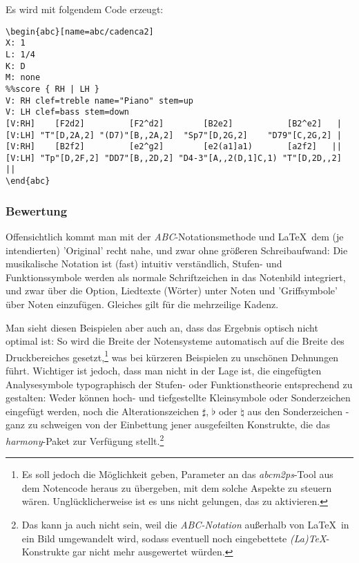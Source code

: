 Es wird mit folgendem Code erzeugt:
\begin{verbatim}
\begin{abc}[name=abc/cadenca2]
X: 1
L: 1/4 
K: D 
M: none
%%score { RH | LH }
V: RH clef=treble name="Piano" stem=up
V: LH clef=bass stem=down
[V:RH]    [F2d2]         [F2^d2]        [B2e2]           [B2^e2]   |
[V:LH] "T"[D,2A,2] "(D7)"[B,,2A,2]  "Sp7"[D,2G,2]    "D79"[C,2G,2] |
[V:RH]    [B2f2]         [e2^g2]        [e2(a1]a1)       [a2f2]   ||
[V:LH] "Tp"[D,2F,2] "DD7"[B,,2D,2] "D4-3"[A,,2(D,1]C,1) "T"[D,2D,,2] ||
\end{abc}
\end{verbatim}

\subsubsection{Bewertung}

Offensichtlich kommt man mit der \textit{ABC}-Notationsmethode und \LaTeX\ dem
(je intendierten) 'Original' recht nahe, und zwar ohne größeren
Schreibaufwand: Die musikalische Notation ist (fast) intuitiv verständlich, Stufen-
und Funktionssymbole werden als normale Schriftzeichen in das Notenbild
integriert, und zwar über die Option, Liedtexte (Wörter) unter Noten und
'Griffsymbole' über Noten einzufügen. Gleiches gilt für die mehrzeilige Kadenz.

Man sieht diesen Beispielen aber auch an, dass das Ergebnis optisch nicht
optimal ist: So wird die Breite der Notensysteme automatisch auf die Breite des
Druckbereiches gesetzt,\footnote{Es soll jedoch die Möglichkeit geben, Parameter
an das \textit{abcm2ps}-Tool aus dem Notencode heraus zu übergeben, mit dem
solche Aspekte zu steuern wären. Unglücklicherweise ist es uns nicht gelungen,
das zu aktivieren.} was bei kürzeren Beispielen zu unschönen Dehnungen führt.
\label{AppraisalABC}Wichtiger ist jedoch, dass man nicht in der Lage ist, die
eingefügten Analysesymbole typographisch der Stufen- oder Funktionstheorie
entsprechend zu gestalten: Weder können hoch- und tiefgestellte Kleinsymbole
oder Sonderzeichen eingefügt werden, noch die Alterationszeichen $\sharp$,
$\flat$ oder $\natural$ aus den Sonderzeichen - ganz zu schweigen von der
Einbettung jener ausgefeilten Konstrukte, die das \textit{harmony}-Paket zur
Verfügung stellt.\footnote{Das kann ja auch nicht sein, weil die
\textit{ABC-Notation} außerhalb von \LaTeX\ in ein Bild umgewandelt wird, sodass
eventuell noch eingebettete \textit{(La)\TeX}-Konstrukte gar nicht mehr
ausgewertet würden.}

